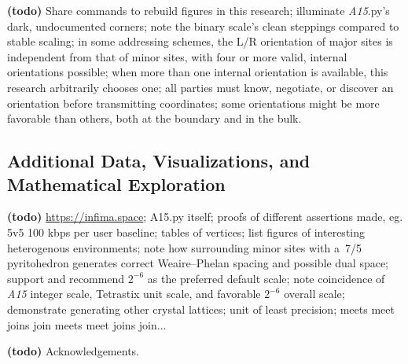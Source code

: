 \documentclass[10pt]{article}
\def\AAAB{\textit{A15}}
\def\TS{Tetrastix} \def\TSP{Tetrastix~Prism} \def\TTSp{The~Tetrastix~prism} \def\tTSp{the~Tetrastix~prism}
\def\WP{Weaire--Phelan} \def\WPH{Weaire--Phelan~Honeycomb} \def\TWPh{The~Weaire--Phelan~honeycomb}
\begin{document}
\textbf{(todo)} Share commands to rebuild figures in this research; illuminate \AAAB.py's dark, undocumented corners; note the
binary scale's clean steppings compared to stable scaling; in some addressing schemes, the L/R orientation of major sites is
independent from that of minor sites, with four or more valid, internal orientations possible; when more than one internal
orientation is available, this research arbitrarily chooses one; all parties must know, negotiate, or discover an orientation
before transmitting coordinates; some orientations might be more favorable than others, both at the boundary and in the bulk.

\subsection{Additional Data, Visualizations, and Mathematical Exploration}\label{additional-data-visualizations-and-mathematical-exploration}

\textbf{(todo)} \url{https://infima.space}; A15.py itself; proofs of different assertions made, eg. 5v5 100 kbps per user
baseline; tables of vertices; list figures of interesting heterogenous environments; note how surrounding minor sites with a~7/5
pyritohedron generates correct \WP{} spacing and possible dual space; support and recommend $2^{-6}$ as the preferred default
scale; note coincidence of \AAAB{} integer scale, \TS{} unit scale, and favorable $2^{-6}$ overall scale; demonstrate generating
other crystal lattices; unit of least precision; meets meet joins join meets meet joins join...


\begin{acknowledgements}

  \textbf{(todo)} Acknowledgements.

\end{acknowledgements}


\nocite{*}  
\end{document}
